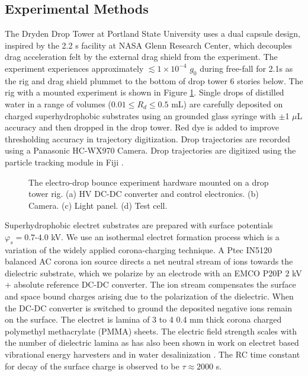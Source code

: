 \documentclass[aip,reprint, floatfix]{revtex4-1}
\begin{document}
\subsection{Experimental Methods}
The Dryden Drop Tower at Portland State University uses a dual capsule design, inspired by the 2.2 s facility at NASA Glenn Research Center, which decouples drag acceleration felt by the external drag shield from the experiment. The experiment experiences approximately $\lesssim 1 \times 10^{-4}$ $g_0$ during free-fall for 2.1s as the rig and drag shield plummet to the bottom of drop tower 6 stories below. The rig with a mounted experiment is shown in Figure \ref{fig:rig}. Single drops of distilled water in a range of volumes ($0.01 \leq R_d \leq 0.5$ mL) are carefully deposited on charged superhydrophobic substrates using an grounded glass syringe with $\pm $1 $\mu$L accuracy and then dropped in the drop tower. Red dye is added to improve thresholding accuracy in trajectory digitization. Drop trajectories are recorded using a Panasonic HC-WX970 Camera. Drop trajectories are digitized using the particle tracking module in Fiji \cite{schindelin_fiji:_2012}.

\begin{figure}
    \centering
    \fontsize{12pt}{13pt}\selectfont
    \def\svgwidth{\columnwidth}
    \caption{The electro-drop bounce experiment hardware mounted on a drop tower rig. (a) HV DC-DC converter and control electronics. (b) Camera. (c) Light panel. (d) Test cell. \label{fig:rig}}
\end{figure}

Superhydrophobic electret substrates are prepared with surface potentials $\varphi_s = 0.7$-$4.0$ kV. We use an isothermal electret formation process which is a variation of the widely applied corona-charging technique. A Ptec IN5120 balanced AC corona ion source directs a net neutral stream of ions towards the dielectric substrate, which we polarize by an electrode with an EMCO P20P $2$ kV$+$ absolute reference DC-DC converter. The ion stream compensates the surface and space bound charges arising due to the polarization of the dielectric. When the DC-DC converter is switched to ground the deposited negative ions remain on the surface. The electret is lamina of 3 to 4 0.4 mm thick corona charged polymethyl methacrylate (PMMA) sheets. The electric field strength scales with the number of dielectric lamina as has also been shown in work on electret based vibrational energy harvesters \cite{wada_stacking_2012} and in water desalinization \cite{ni_desalination_2005}. The RC time constant for decay of the surface charge is observed to be $\tau \approx 2000$ s.
\end{document}
